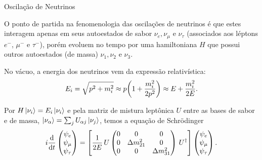 \documentclass[aspectratio=169]{beamer}
\begin{document}
\begin{frame}{Oscilação de Neutrinos}

O ponto de partida na fenomenologia das oscilações de neutrinos é que estes interagem apenas em seus autoestados de sabor $\nu_e, \nu_\mu$ e $\nu_\tau$ (associados aos léptons $e^-$, $\mu^-$ e $\tau^-$), porém evoluem no tempo por uma hamiltoniana $H$ que possui outros autoestados (de massa) $\nu_1, \nu_2$ e $\nu_3$.

\n

No vácuo, a energia dos neutrinos vem da expressão relativística:
\begin{equation} \label{eq:aprox-energ}
E_i = \sqrt{p^2 + m_i^2} \approx
p \qty( 1 + \frac{m_i^2}{2 p^2} ) \approx
E + \frac{m_i^2}{2E}.
\end{equation}

Por $H \ket{\nu_i} = E_i \ket{\nu_i}$ e pela matriz de mistura leptônica $U$ \cite{gonzalez} entre as bases de sabor e de massa, $\ket{\nu_\alpha} = \sum_j U_{\alpha j} \ket{\nu_j}$, temos a equação de Schrödinger
\begin{equation} \label{eq:3nu-vacuo}
i \dv{t}
\begin{pmatrix}
\psi_e \\ \psi_\mu \\ \psi_\tau
\end{pmatrix}
=
\qty[ \frac{1}{2E} \, U
\begin{pmatrix}
0 & 0 & 0 \\
0 & \Delta m_{21}^2 & 0 \\
0 & 0 & \Delta m_{31}^2 \\
\end{pmatrix}
\, U^\dagger ]
\begin{pmatrix}
\psi_e \\ \psi_\mu \\ \psi_\tau
\end{pmatrix}.
\end{equation}

\end{frame}
\end{document}
